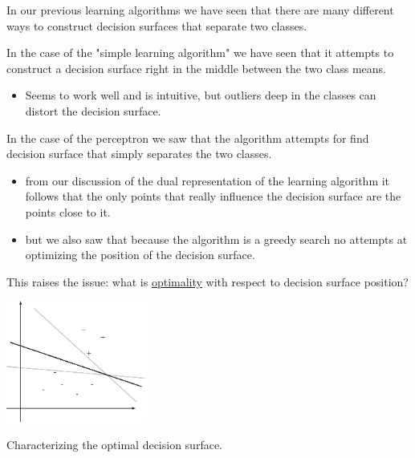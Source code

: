 \documentclass[a4paper,blends,pdf,colorBG,slideColor]{prosper}
\begin{document}
In our previous learning algorithms we have seen that there are many different ways
to construct decision surfaces that separate two classes.

In the case of the "simple learning algorithm" we have seen that it attempts to
construct a decision surface right in the middle between the two class means.
\begin{itemize}
\item Seems to work well and is intuitive, but outliers deep in the classes can distort the
decision surface.
\end{itemize}

In the case of the perceptron we saw that the algorithm attempts for find decision surface
that simply separates the two classes.
\begin{itemize}
\item from our discussion of the dual representation of the learning algorithm it follows that
the only points that really influence the decision surface are the points close to it.
\item but we also saw that because the algorithm is a greedy search no attempts at optimizing
the position of the decision surface.
\end{itemize}

\vspace{.2in}
This raises the issue: what is \ul{optimality} with respect to decision surface position?
\es


\vspace{.2in}

\begin{center}
\includegraphics[height=40mm]{figures/fig06-02.eps}
\end{center}


\es



Characterizing the optimal decision surface.
\end{document}
